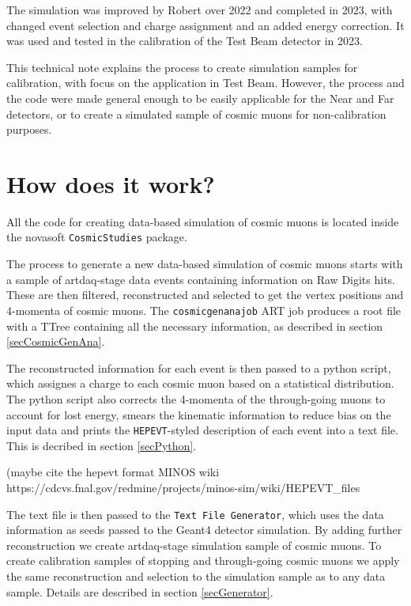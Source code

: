\documentclass[12pt]{article}
\begin{document}
The simulation was improved by Robert over 2022 and completed in 2023, with changed event selection and charge assignment and an added energy correction. It was used and tested in the calibration of the Test Beam detector in 2023.

This technical note explains the process to create simulation samples for calibration, with focus on the application in Test Beam. However, the process and the code were made general enough to be easily applicable for the Near and Far detectors, or to create a simulated sample of cosmic muons for non-calibration purposes.

\section{How does it work?}

All the code for creating data-based simulation of cosmic muons is located inside the novasoft \texttt{CosmicStudies} package.

The process to generate a new data-based simulation of cosmic muons starts with a sample of artdaq-stage data events containing information on Raw Digits hits. These are then filtered, reconstructed and selected to get the vertex positions and 4-momenta of cosmic muons. The \texttt{cosmicgenanajob} ART job produces a root file with a TTree containing all the necessary information, as described in section \ref{secCosmicGenAna}.

The reconstructed information for each event is then passed to a python script, which assignes a charge to each cosmic muon based on a statistical distribution. The python script also corrects the 4-momenta of the through-going muons to account for lost energy, smears the kinematic information to reduce bias on the input data and prints the \texttt{HEPEVT}-styled description of each event into a text file. This is decribed in section \ref{secPython}. 

(maybe cite the hepevt format MINOS wiki https://cdcvs.fnal.gov/redmine/projects/minos-sim/wiki/HEPEVT\_files

The text file is then passed to the \texttt{Text File Generator}, which uses the data information as seeds passed to the Geant4 detector simulation. By adding further reconstruction we create artdaq-stage simulation sample of cosmic muons. To create calibration samples of stopping and through-going cosmic muons we apply the same reconstruction and selection to the simulation sample as to any data sample. Details are described in section \ref{secGenerator}. 
\end{document}
